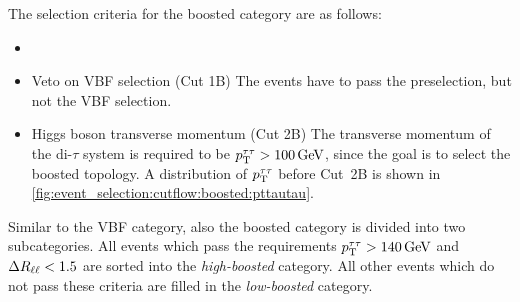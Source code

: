 The selection criteria for the boosted category are as follows:
\begin{itemize}
    \item 
    \item Veto on VBF selection (Cut 1B)
        The events have to pass the preselection, but not the VBF selection.
    \item Higgs boson transverse momentum (Cut 2B)
        The transverse momentum of the di-$\tau$ system is required to be $\pt^{\tau\tau} > \SI{100}{\GeV}$, since
        the goal is to select the boosted topology.
        A distribution of $p_\text{T}^{\tau\tau}$ before Cut~2B is shown in \cref{fig:event_selection:cutflow:boosted:pttautau}.
\end{itemize}
Similar to the VBF category, also the boosted category is divided into two subcategories.
All events which pass the requirements $\pt^{\tau\tau} > \SI{140}{\GeV}$ and $\Delta R_{\ell\ell} < 1.5$ are sorted
into the \emph{high-boosted} category. All other events which do not pass these criteria are filled in the
\emph{low-boosted} category.

